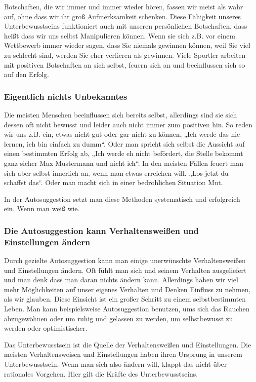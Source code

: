 Botschaften, die wir immer und immer wieder hören, fassen wir meist als wahr auf, ohne dass wir ihr
groß Aufmerksamkeit schenken. Diese Fähigkeit unseres Unterbewusstseins funktioniert auch mit unseren
persönlichen Botschaften, dass heißt dass wir uns selbst Manipulieren können. Wenn sie sich z.B. vor
einem Wettbewerb immer wieder sagen, dass Sie niemals gewinnen können, weil Sie viel zu schlecht
sind, werden Sie eher verlieren als gewinnen. Viele Sportler arbeiten mit positiven Botschaften an
sich selbst, feuern sich an und beeinflussen sich so auf den Erfolg.

\subsubsection{Eigentlich nichts Unbekanntes}

Die meisten Menschen beeinflussen sich bereits selbst, allerdings sind sie sich dessen oft nicht
bewusst und leider auch nicht immer zum positiven hin. So reden wir uns z.B. ein, etwas nicht gut
oder gar nicht zu können, „Ich werde das nie lernen, ich bin einfach zu dumm“. Oder man spricht sich
selbst die Aussicht auf einen bestimmten Erfolg ab, „Ich werde eh nicht befördert, die Stelle bekommt
ganz sicher Max Mustermann und nicht ich“. In den meisten Fällen feuert man sich aber selbst
innerlich an, wenn man etwas erreichen will. „Los jetzt du schaffst das“. Oder man macht sich in
einer bedrohlichen Situation Mut.

In der Autosuggestion setzt man diese Methoden systematisch und erfolgreich ein. Wenn man weiß wie.

\subsubsection{Die Autosuggestion kann  Verhaltensweißen und Einstellungen ändern}

Durch gezielte Autosuggestion kann man einige unerwünschte Verhaltensweißen und Einstellungen ändern.
Oft fühlt man sich und seinem Verhalten ausgeliefert und man denk dass man daran nichts ändern kann.
Allerdings haben wir viel mehr Möglichkeiten auf unser eigenes Verhalten und Denken Einfluss zu
nehmen, als wir glauben. Diese Einsicht ist ein großer Schritt zu einem selbstbestimmten Leben. Man
kann beispielsweise Autosuggestion benutzen, ums sich das Rauchen abzugewöhnen oder um ruhig und
gelassen zu werden, um selbstbewusst zu werden oder optimistischer.

Das Unterbewusstsein ist die Quelle der Verhaltensweißen und Einstellungen.
Die meisten Verhaltensweisen und Einstellungen haben ihren Ursprung in unserem Unterbewusstsein. Wenn
man sich also ändern will, klappt das nicht über rationales Vorgehen. Hier gilt die Kräfte des
Unterbewusstseins.

